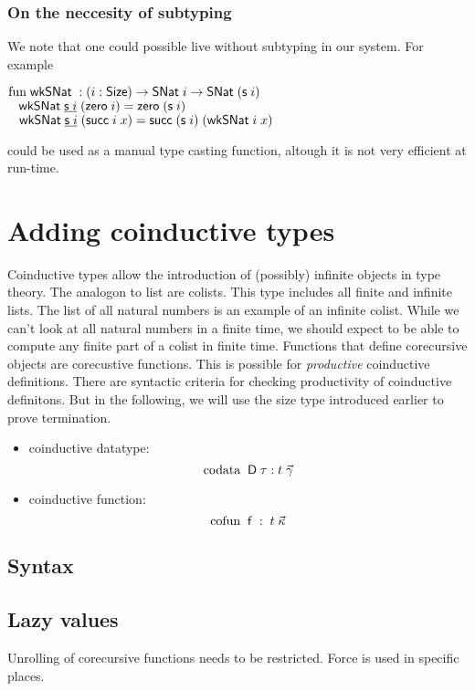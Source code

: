 \subsection{On the neccesity of subtyping}
We note that one could possible live without subtyping in our system.
For example 
\begin{bsp}
$\mathrm{fun}\; \mathsf{wkSNat}\; : (i : \mathsf{Size} ) \rightarrow \mathsf{SNat}\; i \rightarrow \mathsf{SNat}\; (\mathsf{s}\; i)$\\
$\hspace*{3mm} \mathsf{wkSNat}\; \underline{\mathsf{s}\; i} \; (\mathsf{zero}\; i) = \mathsf{zero}\; (\mathsf{s}\; i)$\\
$\hspace*{3mm} \mathsf{wkSNat}\; \underline{\mathsf{s}\; i} \; (\mathsf{succ}\; i \; x) = \mathsf{succ}\; (\mathsf{s}\; i) \; (\mathsf{wkSNat}\; i \; x) $
\end{bsp}
could be used as a manual type casting function, altough it is not very efficient at run-time.
\chapter{Adding coinductive types}

Coinductive types allow the introduction of (possibly) infinite objects in type theory.
The analogon to list are colists. This type includes all finite and infinite lists.
The list of all natural numbers is an example of an infinite colist.
While we can't look at all natural numbers in a finite time, we should expect to be able to
compute any finite part of a colist in finite time.
Functions that define corecursive objects are corecustive functions.
This is possible for \emph{productive} coinductive definitions.
There are syntactic criteria for checking productivity of coinductive definitons.
But in the following, we will use the size type introduced earlier to prove termination.

\begin{itemize}
\item
coinductive datatype:
\[\mathrm{codata}\; \; \mathsf{D} \; \tau : t \; \vec{\gamma}\]  

\item
coinductive function:
\[\mathrm{cofun}\; \; \mathsf{f} \; : \; t \; \vec{\kappa}\]
\end{itemize}

\section{Syntax}

\section{Lazy values}
Unrolling of corecursive functions needs to be restricted.
Force is used in specific places.

